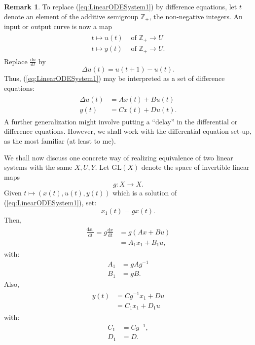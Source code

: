 \documentclass[12pt]{book}
\theoremstyle{plain}
\theoremstyle{definition}
\newtheorem*{remark}{Remark}
\newcommand{\dd}[1]{\mathrm{d}#1}
\begin{document}
\begin{remark}
    To replace (\ref{eq:LinearODESystem1}) by difference equations, let $t$ denote an element of the additive semigroup $\mathbb{Z}_+$, the non-negative integers.
    An input or output curve is now a map
    \begin{align*}
    \begin{split}
        t \mapsto u(t) &\text{ of } \mathbb{Z}_+ \to U \\
        t \mapsto y(t) &\text{ of } \mathbb{Z}_+ \to U.
    \end{split}
    \end{align*}
    Replace $\frac{\dd{u}}{\dd{t}}$ by
    $$\Delta u(t) = u(t + 1) - u(t).$$
    Thus, (\ref{eq:LinearODESystem1}) may be interpreted as a set of difference equations:
    \begin{align*}
    \begin{split}
        \Delta u(t) &= Ax(t) + Bu(t) \\
        y(t) &= Cx(t) + Du(t).
    \end{split}
    \end{align*}
    A further generalization might involve putting a ``delay'' in the differential or difference equations.
    However, we shall work with the differential equation set-up, as the most familiar (at least to me).
\end{remark}

We shall now discuss one concrete way of realizing equivalence of two linear systems with the same $X, U, Y$.
Let $\mathrm{GL}(X)$ denote the space of invertible linear maps
$$g: X \to X.$$
Given $t \mapsto (x(t), u(t), y(t))$ which is a solution of (\ref{eq:LinearODESystem1}), set:
$$x_1(t) = gx(t).$$
Then,
\begin{align}
\begin{split} \label{eq:DifferenceEquationSystem1dx/dt}
    \frac{\dd{x_1}}{\dd{t}} = g\frac{\dd{x}}{\dd{t}} &= g(Ax + Bu) \\
    &= A_1x_1 + B_1u,
\end{split}
\end{align}
with:
\begin{align}
    A_1 &= gAg^{-1} \\
    B_1 &= gB.
\end{align}
Also,
\begin{align}
\begin{split} \label{eq:DifferenceEquationSystem1y}
    y(t) &= Cg^{-1}x_1 + Du \\
    &= C_1x_1 + D_1u
\end{split}
\end{align}
with:
\begin{align}
    C_1 &= Cg^{-1}, \label{eq:C1,1} \\
    D_1 &= D.
\end{align}
\end{document}
